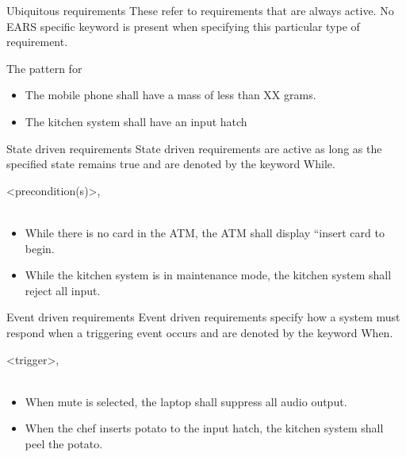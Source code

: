 \documentclass[aspectratio=169]{beamer}
\begin{document}
\begin{slide}{Ubiquitous requirements}
    These refer to requirements that are always active. No EARS specific keyword is present when specifying this particular type of requirement.
    
    The pattern for 
    \begin{block}{}
       
    \end{block}
  \begin{example}
    \begin{itemize}
      \item The mobile phone shall have a mass of less than XX grams.
      \item The kitchen system shall have an input hatch
    \end{itemize}
  \end{example}
\end{slide}


\begin{slide}{State driven requirements}
  State driven requirements are active as long as the specified state remains true and are denoted by the keyword While.
    \begin{block}{}
      \ewhile <precondition(s)>,\\
        \\
    \end{block}  
  
  \begin{example}
  \begin{itemize}
    \item While there is no card in the ATM, the ATM shall display “insert card to begin.
    \item While the kitchen system is in maintenance mode, the kitchen system shall reject all input.
  \end{itemize}
  \end{example}

\end{slide}

\begin{slide}{Event driven requirements}
  Event driven requirements specify how a system must respond when a triggering event occurs and are denoted by the keyword When.
    \begin{block}{}
      \ewhen <trigger>, \\
         \\
    \end{block}
  
  \begin{example}
  \begin{itemize}
    \item When mute is selected, the laptop shall suppress all audio output.
    \item When the chef inserts potato to the input hatch, the kitchen system shall peel the potato.
  \end{itemize}
  \end{example}
\end{slide}
\end{document}
